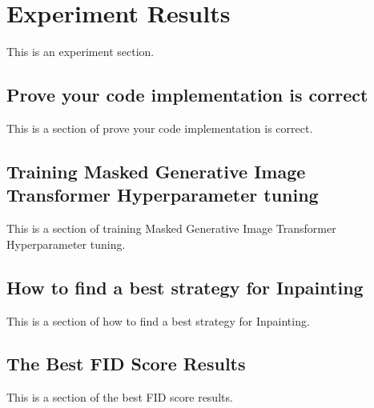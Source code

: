\clearpage
\section{Experiment Results}
This is an experiment section. 

\subsection{Prove your code implementation is correct}
This is a section of prove your code implementation is correct.

\subsection{Training Masked Generative Image Transformer Hyperparameter tuning}
This is a section of training Masked Generative Image Transformer Hyperparameter tuning.

\subsection{How to find a best strategy for Inpainting}
This is a section of how to find a best strategy for Inpainting.

\subsection{The Best FID Score Results}
This is a section of the best FID score results.



